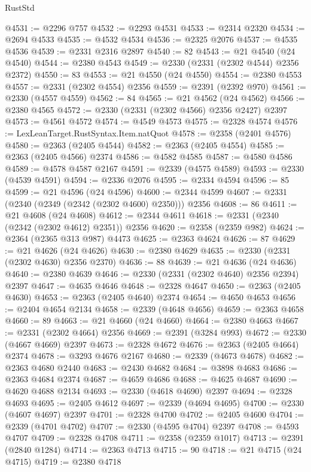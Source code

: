 \begin{lexlean}{RustStd}
\begin{coremodule}
@4531 := @2296 @757
@4532 := @2293 @4531
@4533 := @2314 @2320
@4534 := @2694 @4533
@4535 := @4532 @4534
@4536 := @2325 @2076
@4537 := @4535 @4536
@4539 := @2331 @2316 @2897
@4540 := 82
@4543 := @21 @4540 (@24 @4540)
@4544 := @2380 @4543
@4549 := @2330 (@2331 (@2302 @4544) @2356 @2372)
@4550 := 83
@4553 := @21 @4550 (@24 @4550)
@4554 := @2380 @4553
@4557 := @2331 (@2302 @4554) @2356
@4559 := @2391 (@2392 @970)
@4561 := @2330 (@4557 @4559)
@4562 := 84
@4565 := @21 @4562 (@24 @4562)
@4566 := @2380 @4565
@4572 := @2330 (@2331 (@2302 @4566) @2356 @2427) @2397
@4573 := @4561 @4572
@4574 := @4549 @4573
@4575 := @2328 @4574
@4576 := LexLeanTarget.RustSyntax.Item.natQuot
@4578 := @2358 (@2401 @4576)
@4580 := @2363 (@2405 @4544)
@4582 := @2363 (@2405 @4554)
@4585 := @2363 (@2405 @4566) @2374
@4586 := @4582 @4585
@4587 := @4580 @4586
@4589 := @4578 @4587 @2167
@4591 := @2339 (@4575 @4589)
@4593 := @2330 (@4539 @4591)
@4594 := @2336 @2076
@4595 := @2334 @4594
@4596 := 85
@4599 := @21 @4596 (@24 @4596)
@4600 := @2344 @4599
@4607 := @2331 (@2340 (@2349 (@2342 (@2302 @4600) @2350))) @2356
@4608 := 86
@4611 := @21 @4608 (@24 @4608)
@4612 := @2344 @4611
@4618 := @2331 (@2340 (@2342 (@2302 @4612) @2351)) @2356
@4620 := @2358 (@2359 @982)
@4624 := @2364 (@2365 @313 @987) @4473
@4625 := @2363 @4624
@4626 := 87
@4629 := @21 @4626 (@24 @4626)
@4630 := @2380 @4629
@4635 := @2330 (@2331 (@2302 @4630) @2356 @2370)
@4636 := 88
@4639 := @21 @4636 (@24 @4636)
@4640 := @2380 @4639
@4646 := @2330 (@2331 (@2302 @4640) @2356 @2394) @2397
@4647 := @4635 @4646
@4648 := @2328 @4647
@4650 := @2363 (@2405 @4630)
@4653 := @2363 (@2405 @4640) @2374
@4654 := @4650 @4653
@4656 := @2404 @4654 @2134
@4658 := @2339 (@4648 @4656)
@4659 := @2363 @4658
@4660 := 89
@4663 := @21 @4660 (@24 @4660)
@4664 := @2380 @4663
@4667 := @2331 (@2302 @4664) @2356
@4669 := @2391 (@3284 @993)
@4672 := @2330 (@4667 @4669) @2397
@4673 := @2328 @4672
@4676 := @2363 (@2405 @4664) @2374
@4678 := @3293 @4676 @2167
@4680 := @2339 (@4673 @4678)
@4682 := @2363 @4680 @2440
@4683 := @2430 @4682
@4684 := @3898 @4683
@4686 := @2363 @4684 @2374
@4687 := @4659 @4686
@4688 := @4625 @4687
@4690 := @4620 @4688 @2134
@4693 := @2330 (@4618 @4690) @2397
@4694 := @2328 @4693
@4695 := @2405 @4612
@4697 := @2339 (@4694 @4695)
@4700 := @2330 (@4607 @4697) @2397
@4701 := @2328 @4700
@4702 := @2405 @4600
@4704 := @2339 (@4701 @4702)
@4707 := @2330 (@4595 @4704) @2397
@4708 := @4593 @4707
@4709 := @2328 @4708
@4711 := @2358 (@2359 @1017)
@4713 := @2391 (@2840 @1284)
@4714 := @2363 @4713
@4715 := 90
@4718 := @21 @4715 (@24 @4715)
@4719 := @2380 @4718

\end{coremodule}
\end{lexlean}
